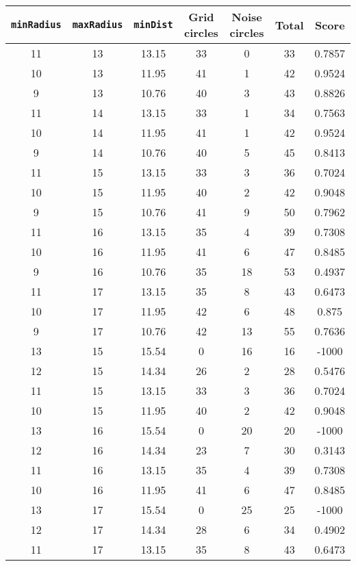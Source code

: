 \documentclass[letterpaper, 12pt]{article}
\begin{document}
\begin{longtable}{|c|c|c|c|c|c|c|}
\hline
\textbf{\texttt{minRadius}} & \textbf{\texttt{maxRadius}} & \textbf{\texttt{minDist}} & \textbf{Grid circles} & \textbf{Noise circles} & \textbf{Total} & \textbf{Score} \\
\hline
11 & 13 & 13.15 & 33 & 0 & 33 & 0.7857 \\
\hline
10 & 13 & 11.95 & 41 & 1 & 42 & 0.9524 \\
\hline
9 & 13 & 10.76 & 40 & 3 & 43 & 0.8826 \\
\hline
11 & 14 & 13.15 & 33 & 1 & 34 & 0.7563 \\
\hline
10 & 14 & 11.95 & 41 & 1 & 42 & 0.9524 \\
\hline
9 & 14 & 10.76 & 40 & 5 & 45 & 0.8413 \\
\hline
11 & 15 & 13.15 & 33 & 3 & 36 & 0.7024 \\
\hline
10 & 15 & 11.95 & 40 & 2 & 42 & 0.9048 \\
\hline
9 & 15 & 10.76 & 41 & 9 & 50 & 0.7962 \\
\hline
11 & 16 & 13.15 & 35 & 4 & 39 & 0.7308 \\
\hline
10 & 16 & 11.95 & 41 & 6 & 47 & 0.8485 \\
\hline
9 & 16 & 10.76 & 35 & 18 & 53 & 0.4937 \\
\hline
11 & 17 & 13.15 & 35 & 8 & 43 & 0.6473 \\
\hline
10 & 17 & 11.95 & 42 & 6 & 48 & 0.875 \\
\hline
9 & 17 & 10.76 & 42 & 13 & 55 & 0.7636 \\
\hline
13 & 15 & 15.54 & 0 & 16 & 16 & -1000 \\
\hline
12 & 15 & 14.34 & 26 & 2 & 28 & 0.5476 \\
\hline
11 & 15 & 13.15 & 33 & 3 & 36 & 0.7024 \\
\hline
10 & 15 & 11.95 & 40 & 2 & 42 & 0.9048 \\
\hline
13 & 16 & 15.54 & 0 & 20 & 20 & -1000 \\
\hline
12 & 16 & 14.34 & 23 & 7 & 30 & 0.3143 \\
\hline
11 & 16 & 13.15 & 35 & 4 & 39 & 0.7308 \\
\hline
10 & 16 & 11.95 & 41 & 6 & 47 & 0.8485 \\
\hline
13 & 17 & 15.54 & 0 & 25 & 25 & -1000 \\
\hline
12 & 17 & 14.34 & 28 & 6 & 34 & 0.4902 \\
\hline
11 & 17 & 13.15 & 35 & 8 & 43 & 0.6473 \\

\end{longtable}
\end{document}
